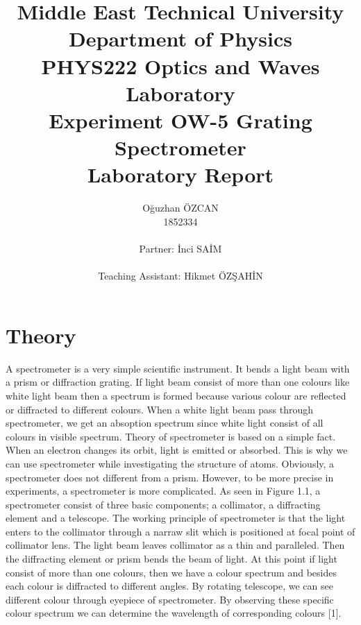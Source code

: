 \documentclass[a4paper,12pt]{report}
\title{Middle East Technical University\\Department of Physics\\PHYS222 Optics and Waves Laboratory\\\textbf{Experiment OW-5 Grating Spectrometer\\Laboratory Report}}
\author{Oğuzhan ÖZCAN\\1852334\\\\Partner: İnci SAİM\\\\Teaching Assistant: Hikmet ÖZŞAHİN}
\begin{document}
\maketitle
\tableofcontents
\listoffigures
\listoftables
\chapter{Theory}
A spectrometer is a very simple scientific instrument. It bends a light beam with a prism or diffraction grating. If light beam consist of more than one colours like white light beam then a spectrum is formed because various colour are reflected or diffracted to different colours. When a white light beam pass through spectrometer, we get an absoption spectrum since white light consist of all colours in visible spectrum. Theory of spectrometer is based on a simple fact. When an electron changes its orbit, light is emitted or absorbed. This is why we can use spectrometer while investigating the structure of atoms. Obviously, a spectrometer does not different from a prism. However, to be more precise in experiments, a spectrometer is more complicated. As seen in Figure 1.1, a spectrometer consist of three basic components; a collimator, a diffracting element and a telescope. The working principle of spectrometer is that the light enters to the collimator through a narraw slit which is positioned at focal point of collimator lens. The light beam leaves collimator as a thin and paralleled. Then the diffracting element or prism bends the beam of light. At this point if light consist of more than one colours, then we have a colour spectrum and besides each colour is diffracted to different angles. By rotating telescope, we can see different colour through eyepiece of spectrometer. By observing these specific colour spectrum we can determine the wavelength of corresponding colours [1].\\\\    
\end{document}
